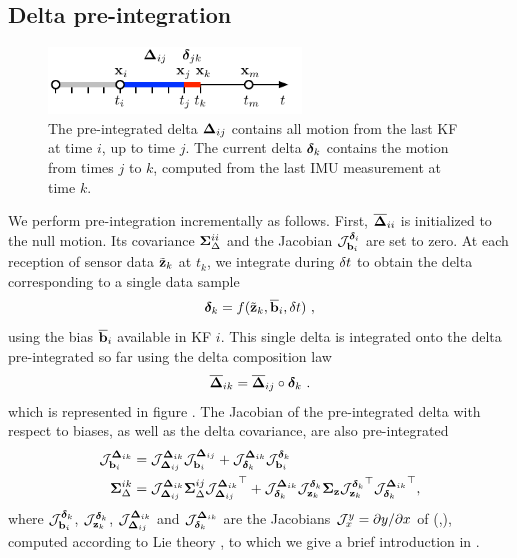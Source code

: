 \subsection{Delta pre-integration}

\begin{figure}[tb]
    \centering
    \includegraphics[width=0.6\textwidth]{figures/delta_time}
    \caption{The pre-integrated delta ${\bm \Delta}_{ij}$ contains all motion from the last KF at time $i$, up to time $j$. 
    The current delta ${\bm \delta}_k$ contains the motion from times $j$ to $k$, computed from the last IMU measurement at time $k$.}
    \label{fig:delta_time}
\end{figure}

We perform pre-integration incrementally as follows. 
First, $\overline{{\bm \Delta}}_{ii}$ is initialized to the null motion. 
Its covariance ${\bm \Sigma}_\Delta^{ii}$ and the Jacobian ${\mathcal{J}^{\bm\delta_i}_{{\bf b}_i}}$ are set to zero. 
At each reception of sensor data $\tilde{{\bf z}}_k$ at $t_k$, we integrate during $\delta t$ to obtain the delta corresponding to a single data sample
%
\begin{equation}
    \bm\delta_k = f(\tilde{{\bf z}}_k, \overline{{\bf b}}_i, \delta t)~, 
    \label{eq:data2delta}
\end{equation}
%
using the bias $\overline{{\bf b}}_i$ available in KF $i$. 
This single delta is integrated onto the delta pre-integrated so far using the delta composition law
%
\begin{equation}
    \overline{{\bm \Delta}}_{ik} = \overline{{\bm \Delta}}_{ij} \circ \bm\delta_k~. 
    \label{eq:deltaPlusDelta}
\end{equation}
%
which is represented in figure .
The Jacobian of the pre-integrated delta with respect to biases, as well as the delta covariance, are also pre-integrated
%
\begin{align}
    {\mathcal{J}^{{\bm \Delta}_{ik}}_{{\bf b}_i}} &= {\mathcal{J}^{{\bm \Delta}_{ik}}_{{\bm \Delta}_{ij}}}{\mathcal{J}^{{\bm \Delta}_{ij}}_{{\bf b}_i}} 
+ {\mathcal{J}^{{\bm \Delta}_{ik}}_{\bm\delta_k}}{\mathcal{J}^{\bm\delta_k}_{{\bf b}_i}} \\
    {\bm \Sigma}_\Delta^{ik} &= {\mathcal{J}^{{\bm \Delta}_{ik}}_{{\bm \Delta}_{ij}}}{\bm \Sigma}_\Delta^{ij}{\mathcal{J}^{{\bm \Delta}_{ik}}_{{\bm \Delta}_{ij}}}^{\top} 
+ {\mathcal{J}^{{\bm \Delta}_{ik}}_{\bm\delta_k}}{\mathcal{J}^{\bm\delta_k}_{{\bf z}_k}}{\bm \Sigma}_{\bf z}{\mathcal{J}^{\bm\delta_k}_{{\bf z}_k}}^{\top}{\mathcal{J}^{{\bm \Delta}_{ik}}_{\bm\delta_k}}^{\top},
\end{align}
%
where ${\mathcal{J}^{\bm\delta_k}_{{\bf b}_i}}$, ${\mathcal{J}^{\bm\delta_k}_{{\bf z}_k}}$, ${\mathcal{J}^{{\bm \Delta}_{ik}}_{{\bm \Delta}_{ij}}}$ and ${\mathcal{J}^{{\bm \Delta}_{ik}}_{\bm\delta_k}}$ 
are the Jacobians ${\mathcal{J}^{y}_{x}}=\partial y/\partial x$ of (,), computed according to Lie theory \cite{sola2018micro}, to which we give a brief introduction in .


